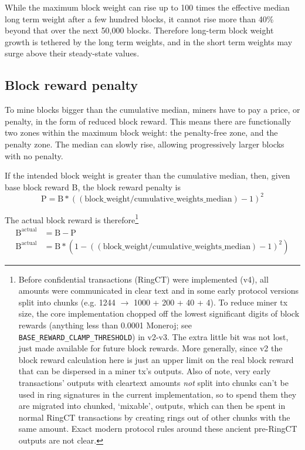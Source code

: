 While the maximum block weight can rise up to 100 times the effective median long term weight after a few hundred blocks, it cannot rise more than 40\% beyond that over the next 50,000 blocks. Therefore long-term block weight growth is tethered by the long term weights, and in the short term weights may surge above their steady-state values.


\subsection{Block reward penalty}
\label{subsec:penalty}

To mine blocks bigger than the cumulative median, miners have to pay a price, or penalty, in the form of reduced block reward. This means there are functionally two zones within the maximum block weight: the penalty-free zone, and the penalty zone. The median can slowly rise, allowing progressively larger blocks with no penalty.

If the intended block weight is greater than the cumulative median, then, given base block reward B, the block reward penalty is\vspace{.1cm}
\[\textrm{P} = \textrm{B}*((\textrm{block\_weight}/\textrm{cumulative\_weights\_median}) - 1)^2\]

The actual block reward is therefore\footnote{Before confidential transactions (RingCT) were implemented (v4), all amounts were communicated in clear text and in some early protocol versions split into chunks (e.g. 1244 $\rightarrow$ 1000 + 200 + 40 + 4). To reduce miner tx size, the core implementation chopped off the lowest significant digits of block rewards (anything less than 0.0001 Moneroj; see {\tt BASE\_REWARD\_CLAMP\_THRESHOLD}) in v2-v3. The extra little bit was not lost, just made available for future block rewards. More generally, since v2 the block reward calculation here is just an upper limit on the real block reward that can be dispersed in a miner tx's outputs. Also of note, very early transactions' outputs with cleartext amounts {\em not} split into chunks can't be used in ring signatures in the current implementation, so to spend them they are migrated into chunked, `mixable', outputs, which can then be spent in normal RingCT transactions by creating rings out of other chunks with the same amount. Exact modern protocol rules around these ancient pre-RingCT outputs are not clear.}\vspace{.3cm}
\begin{align*}
    \textrm{B}^{\textrm{actual}} &= \textrm{B} - \textrm{P} \\
    \textrm{B}^{\textrm{actual}} &= \textrm{B}*(1-((\textrm{block\_weight}/\textrm{cumulative\_weights\_median}) - 1)^2)
\end{align*}

